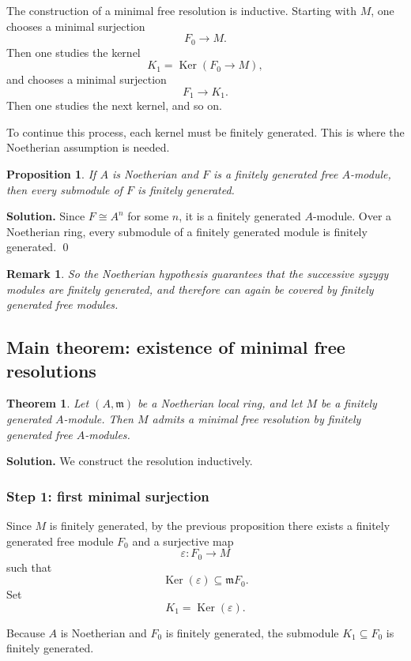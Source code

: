 \documentclass[12pt,a4paper]{article}
\theoremstyle{notespace}
\newtheorem{remark}{Remark}[section]
\DeclareMathOperator{\Ker}{Ker}
\newtheorem{proposition}[definition]{Proposition}
\newtheorem{theorem}[definition]{Theorem}
\newcommand{\m}{\mathfrak m}
\begin{document}
The construction of a minimal free resolution is inductive. Starting with \(M\), one chooses a minimal surjection
\[
F_0\to M.
\]
Then one studies the kernel
\[
K_1=\Ker(F_0\to M),
\]
and chooses a minimal surjection
\[
F_1\to K_1.
\]
Then one studies the next kernel, and so on.

To continue this process, each kernel must be finitely generated. This is where the Noetherian assumption is needed.

\begin{proposition}
	If \(A\) is Noetherian and \(F\) is a finitely generated free \(A\)-module, then every submodule of \(F\) is finitely generated.
\end{proposition}

\textbf{Solution.}
Since \(F\cong A^n\) for some \(n\), it is a finitely generated \(A\)-module. Over a Noetherian ring, every submodule of a finitely generated module is finitely generated. \qed

\begin{remark}
	So the Noetherian hypothesis guarantees that the successive syzygy modules are finitely generated, and therefore can again be covered by finitely generated free modules.
\end{remark}

\subsection{Main theorem: existence of minimal free resolutions}

\begin{theorem}
	Let \((A,\m)\) be a Noetherian local ring, and let \(M\) be a finitely generated \(A\)-module. Then \(M\) admits a minimal free resolution by finitely generated free \(A\)-modules.
\end{theorem}

\textbf{Solution.}
We construct the resolution inductively.

\subsubsection*{Step 1: first minimal surjection}

Since \(M\) is finitely generated, by the previous proposition there exists a finitely generated free module \(F_0\) and a surjective map
\[
\varepsilon:F_0\to M
\]
such that
\[
\Ker(\varepsilon)\subseteq \m F_0.
\]
Set
\[
K_1=\Ker(\varepsilon).
\]

Because \(A\) is Noetherian and \(F_0\) is finitely generated, the submodule \(K_1\subseteq F_0\) is finitely generated.
\end{document}
